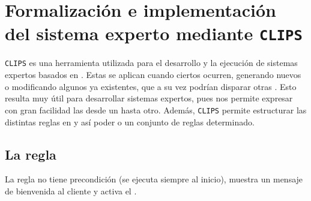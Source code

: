 % 

\section{Formalización e implementación del sistema experto mediante
  \texttt{CLIPS}}

\texttt{CLIPS} es una herramienta utilizada para el desarrollo y la ejecución
de sistemas expertos basados en .  Estas  se
aplican cuando ciertos  ocurren, generando nuevos
 o modificando algunos ya existentes, que a su vez podrían
disparar otras . Esto resulta muy útil para desarrollar sistemas
expertos, pues nos permite expresar con gran facilidad las  desde un  hasta otro.  Además,
\texttt{CLIPS} permite estructurar las distintas reglas en  y
así poder  o  un conjunto de reglas
determinado.

\subsection{La regla }
La regla  no tiene precondición (se ejecuta siempre al inicio), muestra un mensaje de bienvenida al cliente y activa el
.






